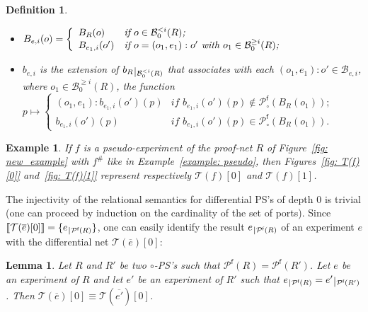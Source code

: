 \documentclass{article}
\theoremstyle{plain}
\newtheorem{definition}{Definition}
\newtheorem{example}{Example}
\newtheorem{lem}[theorem]{Lemma}
\newcommand{\taylor}[2]{\mathcal{T}(#1)[#2]}
\def\restriction#1#2{\mathchoice
              {\setbox1\hbox{${\displaystyle #1}_{\scriptstyle #2}$}
              \restrictionaux{#1}{#2}}
              {\setbox1\hbox{${\textstyle #1}_{\scriptstyle #2}$}
              \restrictionaux{#1}{#2}}
              {\setbox1\hbox{${\scriptstyle #1}_{\scriptscriptstyle #2}$}
              \restrictionaux{#1}{#2}}
              {\setbox1\hbox{${\scriptscriptstyle #1}_{\scriptscriptstyle #2}$}
              \restrictionaux{#1}{#2}}}
\def\restrictionaux#1#2{{#1\,\smash{\vrule height .8\ht1 depth .85\dp1}}_{\,#2}}
\newcommand{\conclusions}[1]{\mathcal{P}^{\textsf{f}}(#1)}
\newcommand{\sm}[1]{\llbracket #1 \rrbracket}
\newcommand{\conclusionscirc}[1]{\mathcal{P}_\circ^{\textsf{f}}(#1)}
\newcommand{\boxesatzerogeq}[2]{\mathcal{B}_0^{\geq #2}(#1)}
\newcommand{\boxesatzerosmaller}[2]{\mathcal{B}_0^{< #2}(#1)}
\newcommand{\scalefacteight}{0.30}
\newcommand{\picteight}[1]{\scalebox{\scalefacteight}{}}
\newcommand{\scalefactfive}{0.4}
\newcommand{\pictfive}[1]{\scalebox{\scalefactfive}{}}
\begin{document}
\begin{definition}
\begin{itemize}
\item $B_{e, i}(o) = \left\lbrace \begin{array}{ll} B_R(o) & \textit{if $o \in \boxesatzerosmaller{R}{i}$;}\\ B_{e_1, i}(o') & \textit{if \mbox{$o = (o_1, e_1):o'$} with $o_1 \in \boxesatzerogeq{R}{i}$;} \end{array} \right.$
\item $b_{e, i}$ is the extension of $\restriction{b_R}{\boxesatzerosmaller{R}{i}}$ that associates with each $(o_1, e_1):o' \in\mathcal{B}_{e, i}$, where $o_1 \in \boxesatzerogeq{R}{i}$, the function $p \mapsto \left\lbrace \begin{array}{ll} 
(o_1, e_1):b_{e_1, i}(o')(p) & \textit{if $b_{e_1, i}(o')(p) \notin \conclusionscirc{B_R(o_1)}$;}\\
b_{e_1, i}(o')(p) & \textit{if $b_{e_1, i}(o')(p) \in \conclusionscirc{B_R(o_1)}$.} \end{array} \right.$
\end{itemize}
\end{definition}


\begin{figure*}\pictfive{T_f_0_csl}
\caption{$\mathcal{T}(f)[0]$}
\label{fig: T(f)[0]}
\end{figure*}

\begin{figure*}\picteight{T_f_1_bis}
\caption{$\mathcal{T}(f)[1]$}
\label{fig: T(f)[1]}
\end{figure*}


\begin{example}
If $f$ is a pseudo-experiment of the proof-net $R$ of Figure~\ref{fig: new_example} with $f^\#$ like in Example~\ref{example: pseudo}, then Figures~\ref{fig: T(f)[0]} and~\ref{fig: T(f)[1]} represent respectively $\taylor{f}{0}$ and $\taylor{f}{1}$.
\end{example}



The injectivity of the relational semantics for differential PS's of depth $0$ is trivial (one can proceed by induction on the cardinality of the set of ports). Since $\sm{\taylor{\overline{e}}{0}} = \{ \restriction{e}{\conclusions{R}} \}$, one can easily identify the result $\restriction{e}{\conclusions{R}}$ of an experiment $e$ with the differential net $\taylor{\overline{e}}{0}$:

\begin{lem}\label{lem: taylor expansion}
Let $R$ and $R'$ be two $\circ$-PS's such that $\conclusions{R} = \conclusions{R'}$. Let $e$ be an experiment of $R$ and let $e'$ be an experiment of $R'$ such that $\restriction{e}{\conclusions{R}} = \restriction{e'}{\conclusions{R'}}$. Then $\taylor{\overline{e}}{0} \equiv \taylor{\overline{e'}}{0}$.
\end{lem}
\end{document}
